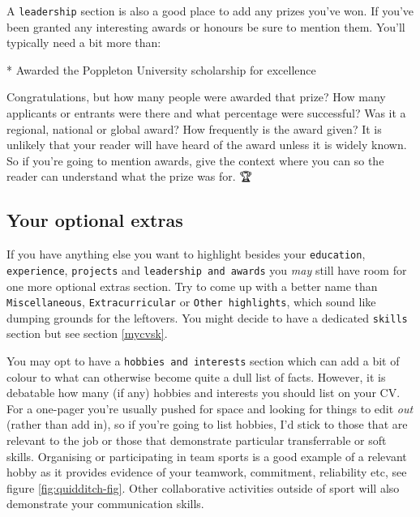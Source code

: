 \documentclass[
]{book}
\newenvironment{Shaded}{\begin{snugshade}}{\end{snugshade}}
\newcommand{\NormalTok}[1]{#1}
\newcommand{\SpecialStringTok}[1]{\textcolor[rgb]{0.31,0.60,0.02}{#1}}
\begin{document}
A \texttt{leadership} section is also a good place to add any prizes you've won. If you've been granted any interesting awards or honours be sure to mention them. You'll typically need a bit more than:

\begin{Shaded}
\begin{Highlighting}[]
\SpecialStringTok{* }\NormalTok{Awarded the Poppleton University scholarship for excellence}
\end{Highlighting}
\end{Shaded}

Congratulations, but how many people were awarded that prize? How many applicants or entrants were there and what percentage were successful? Was it a regional, national or global award? How frequently is the award given? It is unlikely that your reader will have heard of the award unless it is widely known. So if you're going to mention awards, give the context where you can so the reader can understand what the prize was for. 🏆

\hypertarget{misc}{%
\subsection{Your optional extras}\label{misc}}

If you have anything else you want to highlight besides your \texttt{education}, \texttt{experience}, \texttt{projects} and \texttt{leadership\ and\ awards} you \emph{may} still have room for one more optional extras section. Try to come up with a better name than \texttt{Miscellaneous}, \texttt{Extracurricular} or \texttt{Other\ highlights}, which sound like dumping grounds for the leftovers. You might decide to have a dedicated \texttt{skills} section but see section \ref{mycvsk}.

You may opt to have a \texttt{hobbies\ and\ interests} section which can add a bit of colour to what can otherwise become quite a dull list of facts. However, it is debatable how many (if any) hobbies and interests you should list on your CV. For a one-pager you're usually pushed for space and looking for things to edit \emph{out} (rather than add in), so if you're going to list hobbies, I'd stick to those that are relevant to the job or those that demonstrate particular transferrable or soft skills. Organising or participating in team sports is a good example of a relevant hobby as it provides evidence of your teamwork, commitment, reliability etc, see figure \ref{fig:quidditch-fig}. Other collaborative activities outside of sport will also demonstrate your communication skills. \citep{hobbies}
\end{document}
